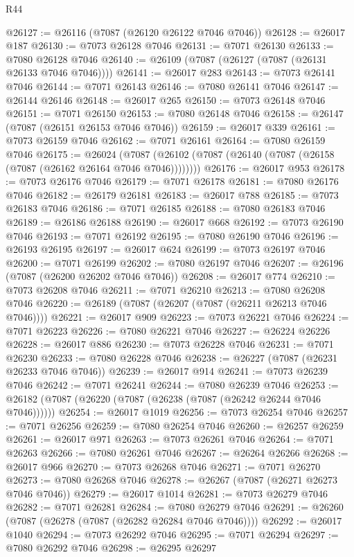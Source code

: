 \begin{lexlean}{R44}
\begin{coremodule}
{@26127 := @26116 (@7087 (@26120 @26122 @7046 @7046))
@26128 := @26017 @187
@26130 := @7073 @26128 @7046
@26131 := @7071 @26130
@26133 := @7080 @26128 @7046
@26140 := @26109 (@7087 (@26127 (@7087 (@26131 @26133 @7046 @7046))))
@26141 := @26017 @283
@26143 := @7073 @26141 @7046
@26144 := @7071 @26143
@26146 := @7080 @26141 @7046
@26147 := @26144 @26146
@26148 := @26017 @265
@26150 := @7073 @26148 @7046
@26151 := @7071 @26150
@26153 := @7080 @26148 @7046
@26158 := @26147 (@7087 (@26151 @26153 @7046 @7046))
@26159 := @26017 @339
@26161 := @7073 @26159 @7046
@26162 := @7071 @26161
@26164 := @7080 @26159 @7046
@26175 := @26024
    (@7087 (@26102 (@7087 (@26140 (@7087 (@26158 (@7087 (@26162 @26164 @7046 @7046))))))))
@26176 := @26017 @953
@26178 := @7073 @26176 @7046
@26179 := @7071 @26178
@26181 := @7080 @26176 @7046
@26182 := @26179 @26181
@26183 := @26017 @788
@26185 := @7073 @26183 @7046
@26186 := @7071 @26185
@26188 := @7080 @26183 @7046
@26189 := @26186 @26188
@26190 := @26017 @668
@26192 := @7073 @26190 @7046
@26193 := @7071 @26192
@26195 := @7080 @26190 @7046
@26196 := @26193 @26195
@26197 := @26017 @624
@26199 := @7073 @26197 @7046
@26200 := @7071 @26199
@26202 := @7080 @26197 @7046
@26207 := @26196 (@7087 (@26200 @26202 @7046 @7046))
@26208 := @26017 @774
@26210 := @7073 @26208 @7046
@26211 := @7071 @26210
@26213 := @7080 @26208 @7046
@26220 := @26189 (@7087 (@26207 (@7087 (@26211 @26213 @7046 @7046))))
@26221 := @26017 @909
@26223 := @7073 @26221 @7046
@26224 := @7071 @26223
@26226 := @7080 @26221 @7046
@26227 := @26224 @26226
@26228 := @26017 @886
@26230 := @7073 @26228 @7046
@26231 := @7071 @26230
@26233 := @7080 @26228 @7046
@26238 := @26227 (@7087 (@26231 @26233 @7046 @7046))
@26239 := @26017 @914
@26241 := @7073 @26239 @7046
@26242 := @7071 @26241
@26244 := @7080 @26239 @7046
@26253 := @26182 (@7087 (@26220 (@7087 (@26238 (@7087 (@26242 @26244 @7046 @7046))))))
@26254 := @26017 @1019
@26256 := @7073 @26254 @7046
@26257 := @7071 @26256
@26259 := @7080 @26254 @7046
@26260 := @26257 @26259
@26261 := @26017 @971
@26263 := @7073 @26261 @7046
@26264 := @7071 @26263
@26266 := @7080 @26261 @7046
@26267 := @26264 @26266
@26268 := @26017 @966
@26270 := @7073 @26268 @7046
@26271 := @7071 @26270
@26273 := @7080 @26268 @7046
@26278 := @26267 (@7087 (@26271 @26273 @7046 @7046))
@26279 := @26017 @1014
@26281 := @7073 @26279 @7046
@26282 := @7071 @26281
@26284 := @7080 @26279 @7046
@26291 := @26260 (@7087 (@26278 (@7087 (@26282 @26284 @7046 @7046))))
@26292 := @26017 @1040
@26294 := @7073 @26292 @7046
@26295 := @7071 @26294
@26297 := @7080 @26292 @7046
@26298 := @26295 @26297
}
\end{coremodule}
\end{lexlean}
